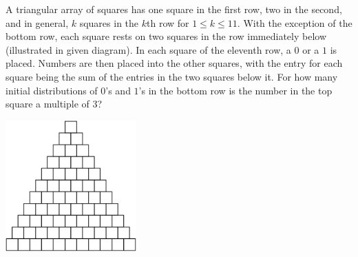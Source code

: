 A triangular array of squares has one square in the first row, two in the second, and in general, $k$ squares in the $k$th row for $1 \leq k \leq 11.$ With the exception of the bottom row, each square rests on two squares in the row immediately below (illustrated in given diagram). In each square of the eleventh row, a $0$ or a $1$ is placed. Numbers are then placed into the other squares, with the entry for each square being the sum of the entries in the two squares below it. For how many initial distributions of $0$'s and $1$'s in the bottom row is the number in the top square a multiple of $3$?
\begin{center}
\includegraphics[width = 50.400000000000006mm]{img/fig0.png}
\end{center}